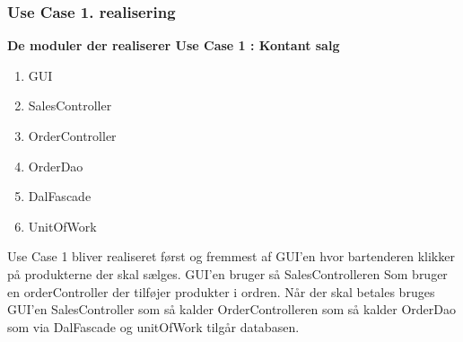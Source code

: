 \subsubsection{ Use Case 1. realisering	}
\textbf{De moduler der realiserer Use Case 1 : Kontant salg}

\begin{enumerate}
	\item GUI
	\item SalesController
	\item OrderController
	\item OrderDao
	\item DalFascade
	\item UnitOfWork
\end{enumerate}

Use Case 1 bliver realiseret først og fremmest af GUI'en hvor bartenderen klikker på produkterne der skal sælges. GUI'en bruger så SalesControlleren Som bruger en orderController der tilføjer produkter i ordren. Når der skal betales bruges GUI'en SalesController som så kalder OrderControlleren som så kalder OrderDao som via DalFascade og unitOfWork tilgår databasen.